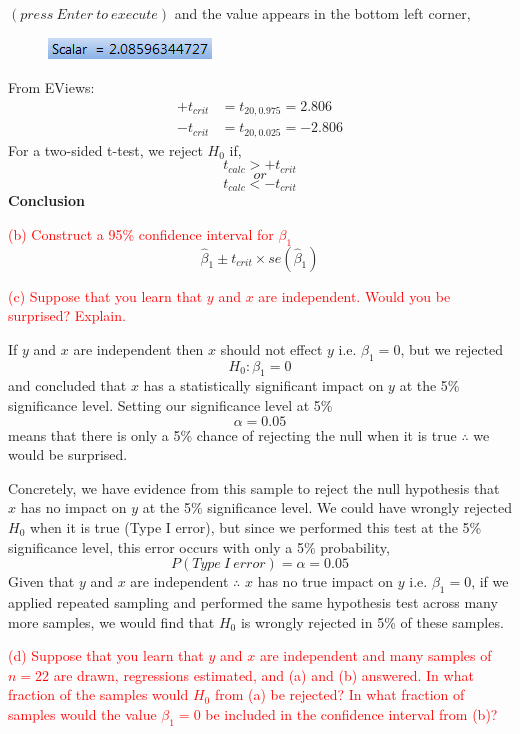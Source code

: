 \documentclass[12pt]{report}
\begin{document}
\vspace{-\baselineskip}\centering $(press\ Enter\ to\ execute)$
\justify and the value appears in the bottom left corner,
\begin{figure}[H]
	\centering
	\includegraphics{tute6_q1_6}
\end{figure}
\vspace{-\baselineskip}
\noindent From EViews: \begin{align*}
+t_{crit} &= t_{20,0.975} = 2.806 \\
-t_{crit} &= t_{20,0.025} = -2.806
\end{align*}
\noindent For a two-sided t-test, we reject $H_0$ if,
$$t_{calc} > +t_{crit}$$
$$or$$
$$t_{calc} < -t_{crit}$$
\noindent \textbf{Conclusion}


\newpage
\noindent \textcolor{red}{(b) Construct a 95\% confidence interval for $\beta_1$}
$$\hat{\beta}_1 \pm t_{crit} \times se(\hat{\beta}_1)$$


\noindent \textcolor{red}{(c) Suppose that you learn that $y$ and $x$ are independent. Would you be surprised? Explain.}

\noindent If $y$ and $x$ are independent then $x$ should not effect $y$ i.e. $\beta_1 = 0$, but we rejected $$H_0: \beta_1 = 0$$ and concluded that $x$ has a statistically significant impact on $y$ at the 5\% significance level. Setting our significance level at 5\% $$\alpha=0.05$$ means that there is only a 5\% chance of rejecting the null when it is true $\therefore$ we would be surprised.

\noindent Concretely, we have evidence from this sample to reject the null hypothesis that $x$ has no impact on $y$ at the 5\% significance level. We could have wrongly rejected $H_0$ when it is true (Type I error), but since we performed this test at the 5\% significance level, this error occurs with only a 5\% probability, $$P(Type\ I\ error) = \alpha = 0.05$$ Given that $y$ and $x$ are independent $\therefore$ $x$ has no true impact on $y$ i.e. $\beta_1 = 0$, if we applied repeated sampling and performed the same hypothesis test across many more samples, we would find that $H_0$ is wrongly rejected in 5\% of these samples.

\noindent \textcolor{red}{(d) Suppose that you learn that $y$ and $x$ are independent and many samples of $n=22$ are drawn, regressions estimated, and (a) and (b) answered. In what fraction of the samples would $H_0$ from (a) be rejected? In what fraction of samples would the value $\beta_1 = 0$ be included in the confidence interval from (b)?}
\end{document}
